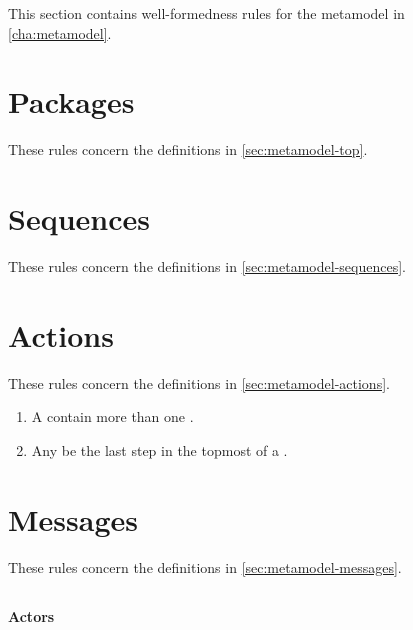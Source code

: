 
This section contains well-formedness rules for the metamodel in
\cref{cha:metamodel}.


\section{Packages}\label{sec:wf-top}

These rules concern the definitions in \cref{sec:metamodel-top}.

\section{Sequences}\label{sec:wf-sequences}

These rules concern the definitions in \cref{sec:metamodel-sequences}.

\section{Actions}\label{sec:wf-actions}

These rules concern the definitions in \cref{sec:metamodel-actions}.

\begin{enumerate}
\item
  A \msequence{} \rfcmustnot{} contain more than one \mfinalaction.
\item
  Any \mfinalaction{} \rfcmust{} be the last step in the topmost
  \msubsequence{} of a \msequence.
\end{enumerate}

\section{Messages}\label{sec:wf-messages}

These rules concern the definitions in \cref{sec:metamodel-messages}.

\subsection{\mmessagespec}

\paragraph{Actors}

